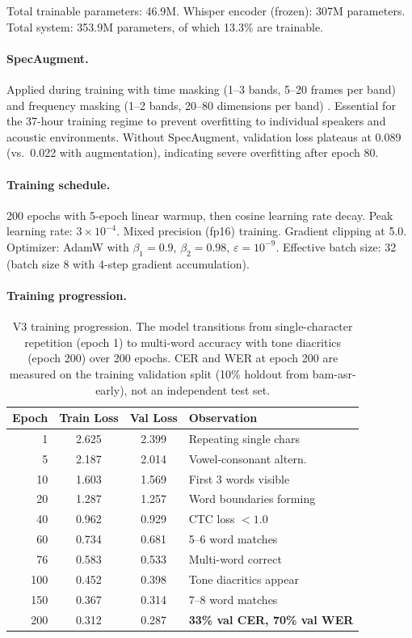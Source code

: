 \documentclass[11pt]{article}
\begin{document}
Total trainable parameters: 46.9M.
Whisper encoder (frozen): 307M parameters.
Total system: 353.9M parameters, of which 13.3\% are trainable.

\paragraph{SpecAugment.}
Applied during training with time masking (1--3 bands, 5--20 frames per band) and frequency masking (1--2 bands, 20--80 dimensions per band) \cite{park2019specaugment}.
Essential for the 37-hour training regime to prevent overfitting to individual speakers and acoustic environments.
Without SpecAugment, validation loss plateaus at 0.089 (vs.\ 0.022 with augmentation), indicating severe overfitting after epoch 80.

\paragraph{Training schedule.}
200 epochs with 5-epoch linear warmup, then cosine learning rate decay.
Peak learning rate: $3 \times 10^{-4}$.
Mixed precision (fp16) training.
Gradient clipping at 5.0.
Optimizer: AdamW with $\beta_1{=}0.9$, $\beta_2{=}0.98$, $\varepsilon{=}10^{-9}$.
Effective batch size: 32 (batch size 8 with 4-step gradient accumulation).

\paragraph{Training progression.}

\begin{table}[t]
\centering
\small
\begin{tabular}{rccl}
\toprule
\textbf{Epoch} & \textbf{Train Loss} & \textbf{Val Loss} & \textbf{Observation} \\
\midrule
1 & 2.625 & 2.399 & Repeating single chars \\
5 & 2.187 & 2.014 & Vowel-consonant altern. \\
10 & 1.603 & 1.569 & First 3 words visible \\
20 & 1.287 & 1.257 & Word boundaries forming \\
40 & 0.962 & 0.929 & CTC loss $< 1.0$ \\
60 & 0.734 & 0.681 & 5--6 word matches \\
76 & 0.583 & 0.533 & Multi-word correct \\
100 & 0.452 & 0.398 & Tone diacritics appear \\
150 & 0.367 & 0.314 & 7--8 word matches \\
200 & 0.312 & 0.287 & \textbf{33\% val CER, 70\% val WER} \\
\bottomrule
\end{tabular}
\caption{V3 training progression. The model transitions from single-character repetition (epoch 1) to multi-word accuracy with tone diacritics (epoch 200) over 200 epochs. CER and WER at epoch 200 are measured on the training validation split (10\% holdout from bam-asr-early), not an independent test set.}
\label{tab:v3-loss-curve}
\end{table}
\end{document}
